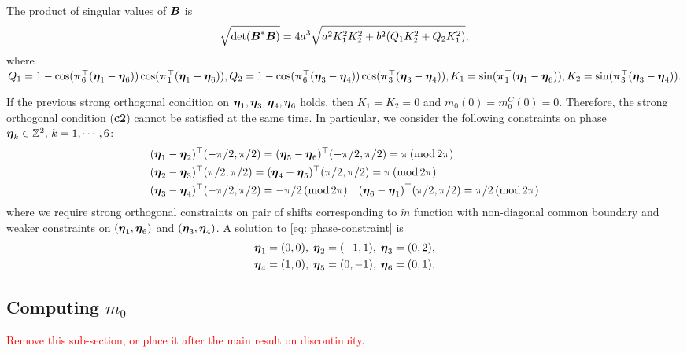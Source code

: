 The product of singular values of $\boldsymbol{B}$ is 
\begin{align}\label{eq: detB}
\sqrt{\text{det}(\boldsymbol{B}^* \boldsymbol{B})} = 4a^3\sqrt{a^2 K_1^2K_2^2 + b^2(Q_1K_2^2 + Q_2K_1^2)},
\end{align}
where $ Q_1 = 1 - \cos(\boldsymbol{\pi}_6^\top(\boldsymbol{\eta}_1-\boldsymbol{\eta}_6))\cos(\boldsymbol{\pi}_1^\top(\boldsymbol{\eta}_1-\boldsymbol{\eta}_6)), Q_2 = 1 - \cos(\boldsymbol{\pi}_6^\top(\boldsymbol{\eta}_3-\boldsymbol{\eta}_4))\cos(\boldsymbol{\pi}_3^\top(\boldsymbol{\eta}_3-\boldsymbol{\eta}_4)), K_1 = \sin(\boldsymbol{\pi}_1^\top(\boldsymbol{\eta}_1-\boldsymbol{\eta}_6)), K_2 = \sin(\boldsymbol{\pi}_3^\top(\boldsymbol{\eta}_3-\boldsymbol{\eta}_4)).$

 If the previous strong orthogonal condition on $\boldsymbol{\eta}_1, \boldsymbol{\eta}_3, \boldsymbol{\eta}_4,\boldsymbol{\eta}_6$ holds, then $K_1 = K_2 = 0$ and $m_0(0)=m_0^C(0)= 0$. Therefore, the strong orthogonal condition ({\bf c2}) cannot be satisfied at the same time. 
In particular, we consider the following constraints on phase $\boldsymbol{\eta}_k\in \mathbb{Z}^2,\, k = 1,\cdots,6$:
\begin{align}
\label{eq: phase-constraint}
&(\boldsymbol{\eta}_1-\boldsymbol{\eta}_2)^\top(-\pi/2, \pi/2) = (\boldsymbol{\eta}_5-\boldsymbol{\eta}_6)^\top(-\pi/2,\pi/2) = \pi\, (\text{mod}\, 2\pi)\notag\\
&(\boldsymbol{\eta}_2-\boldsymbol{\eta}_3)^\top(\pi/2,\pi/2) = (\boldsymbol{\eta}_4-\boldsymbol{\eta}_5)^\top(\pi/2,\pi/2) = \pi\, (\text{mod}\, 2\pi)\\
&(\boldsymbol{\eta}_3-\boldsymbol{\eta}_4)^\top(-\pi/2, \pi/2) =-\pi/2\,(\text{mod}\,2\pi)\quad (\boldsymbol{\eta}_6 - \boldsymbol{\eta}_1)^\top(\pi/2,\pi/2) = \pi/2\, (\text{mod}\,2\pi) \notag
\end{align}
where we require strong orthogonal constraints on pair of shifts corresponding to $\widetilde{m}$ function with non-diagonal common boundary and weaker constraints on $(\boldsymbol{\eta}_1,\boldsymbol{\eta}_6)$ and $(\boldsymbol{\eta}_3,\boldsymbol{\eta}_4)$. A solution to \eqref{eq: phase-constraint} is 
\begin{align}\label{eq: phase-sol}
\boldsymbol{\eta}_1 = (0,0),\; \boldsymbol{\eta}_2 = (-1,1),\; \boldsymbol{\eta}_3 = (0,2),\notag\\
\boldsymbol{\eta}_4 = (1,0),\; \boldsymbol{\eta}_5 = (0,-1),\; \boldsymbol{\eta}_6 = (0,1).
\end{align}

\subsection{Computing $m_0$}\label{subsec: compute-m0}
\textcolor{red}{Remove this sub-section, or place it after the main result on discontinuity}.

